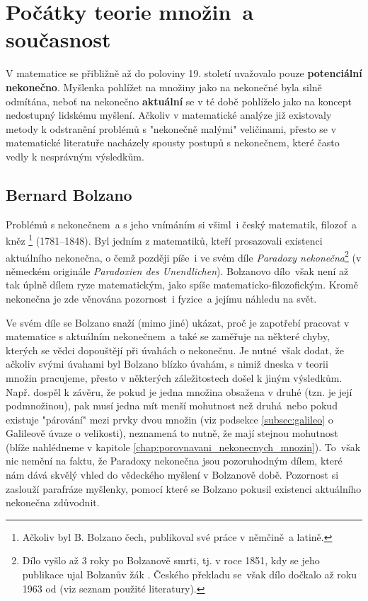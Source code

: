 \section{Počátky teorie množin~a současnost}

V matematice se přibližně až do poloviny 19. století uvažovalo pouze \textbf{potenciální nekonečno}. Myšlenka pohlížet na množiny jako na nekonečné byla silně odmítána, neboť na nekonečno \textbf{aktuální} se v té době pohlíželo jako na koncept nedostupný lidskému myšlení. Ačkoliv v matematické analýze již existovaly metody k odstranění problémů s "nekonečně malými" veličinami, přesto se v matematické literatuře nacházely spousty postupů s nekonečnem, které často vedly k nesprávným výsledkům.
\subsection{Bernard Bolzano}\label{subsec:bolzano}
Problémů s nekonečnem~a s jeho vnímáním si všiml~i český matematik, filozof~a kněz \footnote{Ačkoliv byl B. Bolzano čech, publikoval své práce v němčině~a latině.} (1781--1848). Byl jedním z matematiků, kteří prosazovali existenci aktuálního nekonečna, o čemž později píše~i ve svém díle \emph{Paradoxy nekonečna}\footnote{Dílo vyšlo až 3 roky po Bolzanově smrti, tj. v roce 1851, kdy se jeho publikace ujal Bolzanův žák . Českého překladu se~však dílo dočkalo až roku 1963 od  (viz seznam použité literatury).} (v německém originále \emph{Paradoxien des Unendlichen}). Bolzanovo dílo~však není až tak úplně dílem ryze matematickým, jako spíše matematicko-filozofickým. Kromě nekonečna je zde věnována pozornost~i fyzice~a jejímu náhledu na svět.\par
Ve svém díle se Bolzano snaží (mimo jiné) ukázat, proč je zapotřebí pracovat v matematice s aktuálním nekonečnem~a také se zaměřuje na některé chyby, kterých se vědci dopouštějí při úvahách o nekonečnu. Je nutné~však dodat, že ačkoliv svými úvahami byl Bolzano blízko úvahám, s nimiž dneska v teorii množin pracujeme, přesto v některých záležitostech došel k jiným výsledkům. Např. dospěl k závěru, že pokud je jedna množina obsažena v druhé (tzn. je její podmnožinou), pak musí jedna mít menší mohutnost než druhá~nebo pokud existuje "párování" mezi prvky dvou množin (viz podsekce \ref{subsec:galileo}
o Galileově úvaze o velikosti), neznamená to nutně, že mají stejnou mohutnost (blíže nahlédneme v kapitole \ref{chap:porovnavani_nekonecnych_mnozin}). To~však nic nemění na faktu, že Paradoxy nekonečna jsou pozoruhodným dílem, které nám dává skvělý vhled do vědeckého myšlení v Bolzanově době. Pozornost si zaslouží parafráze myšlenky, pomocí které se Bolzano pokusil existenci aktuálního nekonečna zdůvodnit.

